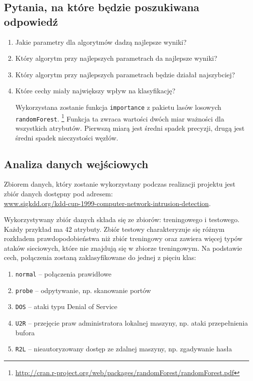 \documentclass[a4paper, 12pt]{article}
\begin{document}
\subsection{Pytania, na które będzie poszukiwana odpowiedź}

\begin{enumerate}
 \item Jakie parametry dla algorytmów dadzą najlepsze wyniki?
 \item Który algorytm przy najlepszych parametrach da najlepsze wyniki?
 \item Który algorytm przy najlepszych parametrach będzie działał najszybciej?
 \item Które cechy miały największy wpływ na klasyfikację?

Wykorzystana zostanie funkcja \texttt{importance} z pakietu lasów losowych \texttt{randomForest}.
\footnote{\url{http://cran.r-project.org/web/packages/randomForest/randomForest.pdf}}
Funkcja ta zwraca wartości dwóch miar ważności dla wszystkich atrybutów.
Pierwszą miarą jest średni spadek precyzji, drugą jest średni spadek nieczystości węzłów.
\end{enumerate}

\subsection{Analiza danych wejściowych}

Zbiorem danych, który zostanie wykorzystany podczas realizacji projektu jest zbiór danych dostępny 
pod adresem: \\
\url{www.sigkdd.org/kdd-cup-1999-computer-network-intrusion-detection}.

Wykorzystywany zbiór danych składa się ze zbiorów: treningowego i testowego.
Każdy przykład ma 42 atrybuty.
Zbiór testowy charakteryzuje się różnym rozkładem prawdopodobieństwa niż zbiór treningowy oraz
zawiera więcej typów ataków sieciowych, które nie znajdują się w zbiorze treningowym.
Na podstawie cech, połączenia zostaną zaklasyfikowane do jednej z pięciu klas:

\begin{enumerate}
 \item \texttt{normal} -- połączenia prawidłowe
 \item \texttt{probe} -- odpytywanie, np. skanowanie portów
 \item \texttt{DOS} -- ataki typu Denial of Service
 \item \texttt{U2R} -- przejęcie praw administratora lokalnej maszyny, np. ataki przepełnienia bufora
 \item \texttt{R2L} -- nieautoryzowany dostęp ze zdalnej maszyny, np. zgadywanie hasła
\end{enumerate}
\end{document}
